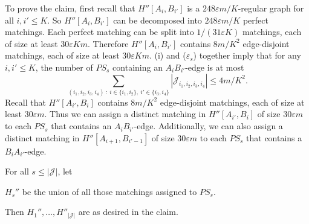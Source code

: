 \documentclass{memo-l}
\def\COMMENT#1{}
\def\eps{\varepsilon}
\def\I{i_1,i_2,i_3,i_4}
\numberwithin{section}{chapter}
\numberwithin{equation}{section}
\numberwithin{firstthm}{section}
\numberwithin{figure}{section}
\begin{document}
{\noindent
To prove the claim, first recall that $H''[A_i,B_{i'}]$ is a $248 \eps m/K$-regular graph for all $i,i' \le K$.
So $H''[A_{i},B_{i'}]$ can be decomposed into $248 \eps m/K$ perfect matchings. 
Each perfect matching can be split into $1/(31\eps K) $ matchings, each of size at least $30 \eps K  m$.
Therefore $H''[A_{i},B_{i'}]$ contains $8m/K^2$ edge-disjoint matchings, each of size at least $30 \eps K  m$.
(i) and ($\eps_s$) together imply that for any $i,i' \le K$, the number of $PS_s$ containing an $A_iB_{i'}$-edge is at most 
$$ \sum_{(\I)\ : \ i \in \{i_1,i_2\}, \ i' \in \{i_3,i_4\}} | \mathcal{J}_{\I} | \le 4 m/K^2.$$
Recall that $H''[A_{i'},B_{i}]$ contains $8m/K^2$ edge-disjoint matchings, each of size at least $30 \eps m$.
Thus we can assign a distinct matching in $H''[A_{i'},B_{i}]$ of size $30 \eps m$ to each $PS_s$ that contains an $A_{i}B_{i'}$-edge. 
Additionally, we can also assign a distinct matching in $H''[A_{i+1},B_{i'-1}]$ of size $30 \eps m$ to each $PS_s$ that contains a $B_{i}A_{i'}$-edge.%
    \COMMENT{Here we use that the number of $PS_s$ containing an $B_{i}A_{i'}$-edge is at most 
$\sum_{(i_2,i_3,i_4)\ : \ i \in \{i_3,i_4\}} | \mathcal{J}_{i',i_2,i_3,i_4} | \le 2 m/K^2.$}
For all $s \le |\mathcal{J}|$, let%
\COMMENT{Andy: set becomes let}
$H_s''$ be the union of all those matchings assigned to $PS_s$.%
    \COMMENT{Deryk: reworded}
Then $H_1'', \dots, H''_{|\mathcal{J} |}$ are as desired in the claim.
\medskip

}
\end{document}
